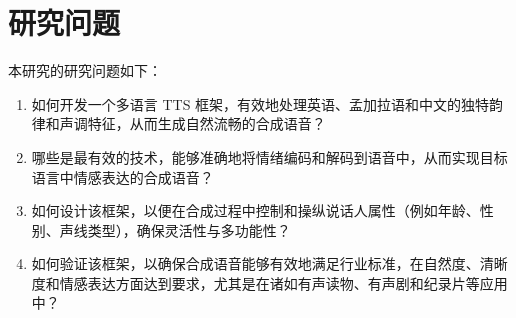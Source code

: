 \section*{研究问题}

本研究的研究问题如下：
\begin{enumerate}

    \item 如何开发一个多语言 TTS 框架，有效地处理英语、孟加拉语和中文的独特韵律和声调特征，从而生成自然流畅的合成语音？

    \item 哪些是最有效的技术，能够准确地将情绪编码和解码到语音中，从而实现目标语言中情感表达的合成语音？

    \item 如何设计该框架，以便在合成过程中控制和操纵说话人属性（例如年龄、性别、声线类型），确保灵活性与多功能性？

    \item 如何验证该框架，以确保合成语音能够有效地满足行业标准，在自然度、清晰度和情感表达方面达到要求，尤其是在诸如有声读物、有声剧和纪录片等应用中？

\end{enumerate}